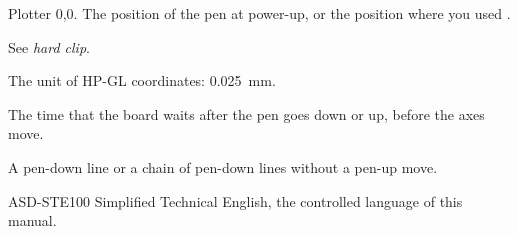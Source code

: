 \begin{description}[style=nextline,leftmargin=1.2em,font=\sffamily\bfseries\color{navy}]
  \item[Origin] Plotter 0,0. The position of the pen at power-up, or the
        position where you used .
  \item[Plot area] See \textit{hard clip}.
  \item[Plotter unit] The unit of HP-GL coordinates: \SI{0.025}{mm}.
  \item[Settle time] The time that the board waits after the pen goes down or
        up, before the axes move.
  \item[Stroke] A pen-down line or a chain of pen-down lines without a pen-up
        move.
  \item[STE] ASD-STE100 Simplified Technical English, the controlled language
        of this manual.
\end{description}
